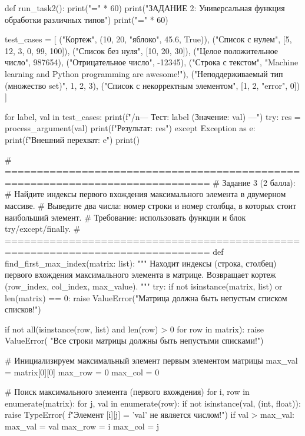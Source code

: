 \documentclass[14pt,a4paper]{extarticle}
\begin{document}
\begin{CodeListing}
def run_task2():
    print("=" * 60)
    print("ЗАДАНИЕ 2: Универсальная функция обработки различных типов")
    print("=" * 60)

    test_cases = [
        ("Кортеж", (10, 20, "яблоко", 45.6, True)),
        ("Список с нулем", [5, 12, 3, 0, 99, 100]),
        ("Список без нуля", [10, 20, 30]),
        ("Целое положительное число", 987654),
        ("Отрицательное число", -12345),
        ("Строка с текстом", "Machine learning and Python programming are awesome!"),
        ("Неподдерживаемый тип (множество set)", {1, 2, 3}),
        ("Список с некорректным элементом", [1, 2, "error", 0])
    ]

    for label, val in test_cases:
        print(f"/n--- Тест: {label} (Значение: {val}) ---")
        try:
            res = process_argument(val)
            print(f"Результат: {res}")
        except Exception as e:
            print(f"Внешний перехват: {e}")
    print()


# ==============================================================================
# Задание 3 (2 балла):
# Найдите индексы первого вхождения максимального элемента в двумерном массиве.
# Выведите два числа: номер строки и номер столбца, в которых стоит наибольший элемент.
# Требование: использовать функции и блок try/except/finally.
# ==============================================================================
def find_first_max_index(matrix: list):
    """
    Находит индексы (строка, столбец) первого вхождения максимального элемента в матрице.
    Возвращает кортеж (row_index, col_index, max_value).
    """
    try:
        if not isinstance(matrix, list) or len(matrix) == 0:
            raise ValueError("Матрица должна быть непустым списком списков!")

        if not all(isinstance(row, list) and len(row) > 0 for row in matrix):
            raise ValueError(
                "Все строки матрицы должны быть непустыми списками!")

        # Инициализируем максимальный элемент первым элементом матрицы
        max_val = matrix[0][0]
        max_row = 0
        max_col = 0

        # Поиск максимального элемента (первого вхождения)
        for i, row in enumerate(matrix):
            for j, val in enumerate(row):
                if not isinstance(val, (int, float)):
                    raise TypeError(
                        f"Элемент [{i}][{j}] = '{val}' не является числом!")
                if val > max_val:
                    max_val = val
                    max_row = i
                    max_col = j


\end{CodeListing}
\end{document}
